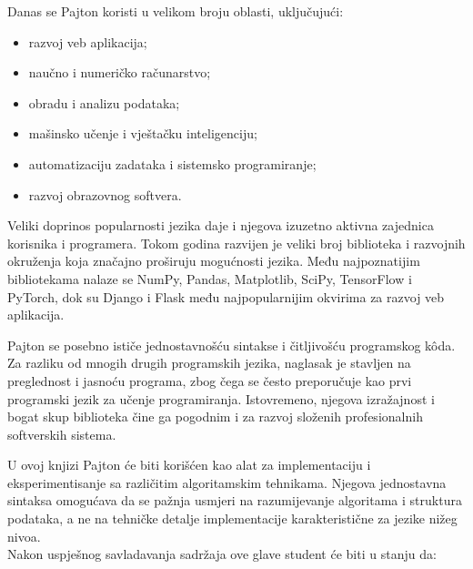 Danas se Pajton koristi u velikom broju oblasti, uključujući:

\begin{itemize}
	\item razvoj veb aplikacija;
	\item naučno i numeričko računarstvo;
	\item obradu i analizu podataka;
	\item mašinsko učenje i vještačku inteligenciju;
	\item automatizaciju zadataka i sistemsko programiranje;
	\item razvoj obrazovnog softvera.
\end{itemize}

Veliki doprinos popularnosti jezika daje i njegova izuzetno aktivna zajednica korisnika i programera. Tokom godina razvijen je veliki broj biblioteka i razvojnih okruženja koja značajno proširuju mogućnosti jezika. Među najpoznatijim bibliotekama nalaze se NumPy, Pandas, Matplotlib, SciPy, TensorFlow i PyTorch, dok su Django i Flask među najpopularnijim okvirima za razvoj veb aplikacija.

Pajton se posebno ističe jednostavnošću sintakse i čitljivošću programskog k\^oda. Za razliku od mnogih drugih programskih jezika, naglasak je stavljen na preglednost i jasnoću programa, zbog čega se često preporučuje kao prvi programski jezik za učenje programiranja. Istovremeno, njegova izražajnost i bogat skup biblioteka čine ga pogodnim i za razvoj složenih profesionalnih softverskih sistema.

U ovoj knjizi Pajton će biti korišćen kao alat za implementaciju i eksperimentisanje sa različitim algoritamskim tehnikama. Njegova jednostavna sintaksa omogućava da se pažnja usmjeri na razumijevanje algoritama i struktura podataka, a ne na tehničke detalje implementacije karakteristične za jezike nižeg nivoa.\\


Nakon uspješnog savladavanja sadržaja ove glave student će biti u stanju da:

